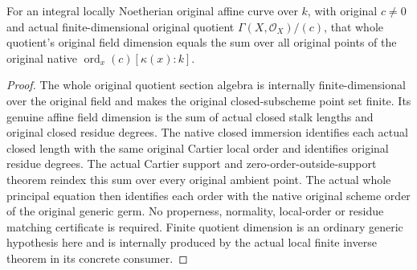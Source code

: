 \begin{theorem}
\label{thm:fc-affine-principal-all-native-orders}
\leanok
{}
For an integral locally Noetherian original affine curve over $k$, with
original $c\ne0$ and actual finite-dimensional original quotient
$\Gamma(X,\mathcal O_X)/(c)$, that whole quotient's original field dimension
equals the sum over all original points of the original native
$\operatorname{ord}_x(c)[\kappa(x):k]$.
\end{theorem}
\begin{proof}
The whole original quotient section algebra is internally finite-dimensional
over the original field and makes the original closed-subscheme point set
finite.  Its genuine affine field dimension is the sum of actual closed
stalk lengths and original closed residue degrees.  The native closed
immersion identifies each actual closed length with the same original
Cartier local order and identifies original residue degrees.  The actual
Cartier support and zero-order-outside-support theorem reindex this sum over
every original ambient point.  The actual whole principal equation then
identifies each order with the native original scheme order of the original
generic germ.  No properness, normality, local-order or residue matching
certificate is required.  Finite quotient dimension is an ordinary generic
hypothesis here and is internally produced by the actual local finite
inverse theorem in its concrete consumer.
\end{proof}
